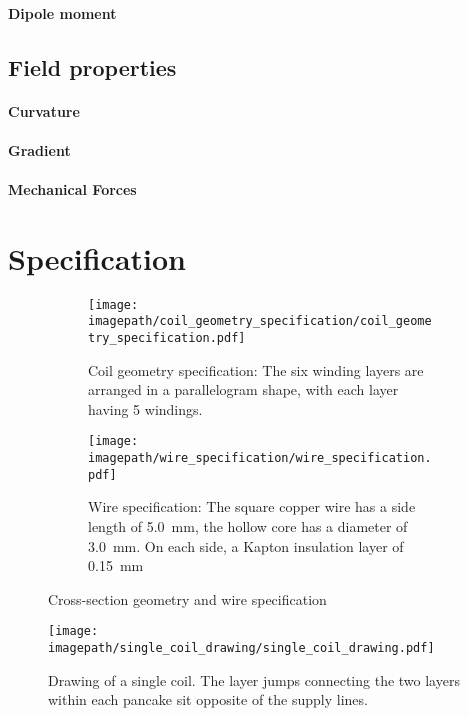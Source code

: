 \paragraph{Dipole moment}

\subsection*{Field properties}
\paragraph{Curvature}
\paragraph{Gradient}
\paragraph{Mechanical Forces}






\section{Specification}
\begin{figure}
    \centering
    \begin{subfigure}[t]{0.45\textwidth}
        \centering
        \texttt{[image: \\imagepath/coil\_geometry\_specification/coil\_geometry\_specification.pdf]}
        \caption{Coil geometry specification: The six winding layers are arranged in a parallelogram shape, with each layer having 5 windings.}
        \label{fig:coil_geometry_specification}
    \end{subfigure}
    \hspace{0.09\textwidth}
    \begin{subfigure}[t]{0.45\textwidth}
        \centering
        \texttt{[image: \\imagepath/wire\_specification/wire\_specification.pdf]}
        \caption{Wire specification: The square copper wire has a side length of \SI{5.0}{\milli\meter}, the hollow core has a diameter of \SI{3.0}{\milli\meter}. On each side, a Kapton insulation layer of \SI{0.15}{\milli\meter} }
        \label{fig:wire_specification}
    \end{subfigure}
    \caption{Cross-section geometry and wire specification}
\end{figure}

\begin{figure}
    \centering
    \texttt{[image: \\imagepath/single\_coil\_drawing/single\_coil\_drawing.pdf]}
    \caption{Drawing of a single coil. The layer jumps connecting the two layers within each pancake sit opposite of the supply lines.} 
    \label{fig:single_coil_drawing}
\end{figure}

